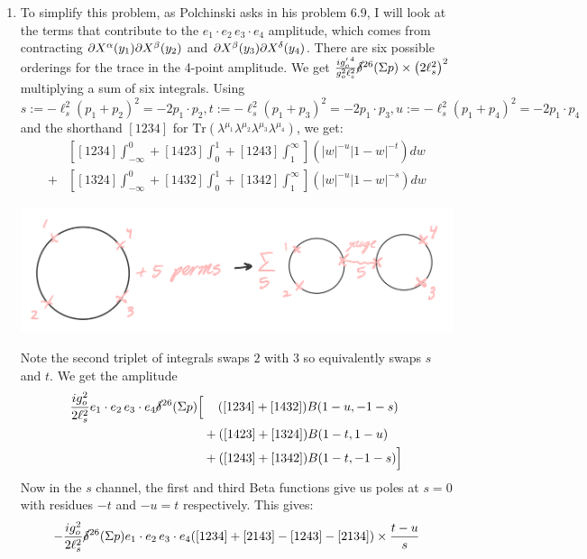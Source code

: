 \documentclass[11pt, class=article, crop=false]{standalone}
\begin{document}
\begin{enumerate}
	
	\item To simplify this problem, as Polchinski asks in his problem 6.9, I will look at the terms that contribute to the $e_1 \cdot e_2 \, e_3 \cdot e_4$ amplitude, which comes from contracting $\partial X^\alpha(y_1) \partial X^\beta(y_2)$ and $\partial X^\beta(y_3) \partial X^\delta(y_4)$. There are six possible orderings for the trace in the 4-point amplitude. We get $\frac{i {g_o'}^4}{g_o^2 \ell_s^2}  \cancel\delta^{26}(\Sigma p) \times \left(2 \ell_s^2 \right)^2$ multiplying a sum of six integrals. Using $s := - \ell_s^2 (p_1 + p_2)^2 = -2 p_1 \cdot p_2, t := - \ell_s^2 (p_1 + p_3)^2 = - 2 p_1 \cdot p_3, u := - \ell_s^2 (p_1 + p_4)^2 = - 2 p_1 \cdot p_4$ and the shorthand $[1234]$ for $\mathrm{Tr}(\lambda^{\mu_1} \lambda^{\mu_2} \lambda^{\mu_3} \lambda^{\mu_4})$, we get:
	\[
	\begin{aligned}
		& \left[[1234] \int_{-\infty}^0
		 + [1423] \int_0^1 + [1243] \int_1^\infty \right] (|w|^{-u} |1-w|^{-t}) dw \\
		+ & \left[[1324] \int_{-\infty}^0 + [1432] \int_0^1 + [1342] \int_1^\infty \right] (|w|^{- u} |1-w|^{-s}) dw
	\end{aligned}
	\]
	\begin{center}
		\includegraphics[scale=0.1]{"Drawings/511"}
	\end{center}
	Note the second triplet of integrals swaps $2$ with $3$ so equivalently swaps $s$ and $t$. We get the amplitude 
	\[
	\begin{aligned}
		\frac{i g_o^2}{2 \ell_s^2} e_1 \cdot e_2\, e_3 \cdot e_4 \cancel\delta^{26} (\Sigma p) \Big[& \, \quad ([1234] + [1432]) B(1 -  u, -1 - s)\\
		& + ([1423] + [1324]) B(1 -  t, 1 - u)\\
		& + ([1243] + [1342]) B(1 -  t, -1 -  s) \Big]
	\end{aligned}
	\]
	Now in the $s$ channel, the first and third Beta functions give us poles at $s = 0$ with residues $-t$ and $-u = t$ respectively. This gives:
	\begin{equation}\label{eq:4ptgauge}
		-\frac{i g_o^2}{2 \ell_s^2} \sdelta^{26} (\Sigma p) e_1 \cdot e_2 \, e_3 \cdot e_4 ([1234] + [2143] - [1243] - [2134]) \times \frac{t-u}{s}

\end{equation}
\end{enumerate}
\end{document}
